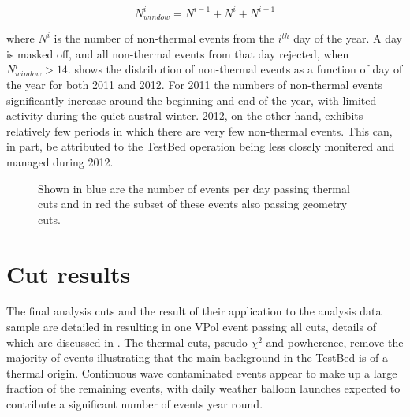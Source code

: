 \begin{equation}
  N^{i}_{window} = N^{i-1} + N^{i} + N^{i+1}
\end{equation}

\noindent where $N^{i}$ is the number of non-thermal events from the $i^{th}$ day of the year. A day is masked off, and all non-thermal events from that day rejected, when $N^{i}_{window} > 14$.  shows the distribution of non-thermal events as a function of day of the year for both 2011 and 2012. For 2011 the numbers of non-thermal events significantly increase around the beginning and end of the year, with limited activity during the quiet austral winter. 2012, on the other hand, exhibits relatively few periods in which there are very few non-thermal events. This can, in part, be attributed to the TestBed operation being less closely monitered and managed during 2012.

\begin{figure}[htpb]
\hfill
{}
\caption{Shown in blue are the number of events per day passing thermal cuts and in red the subset of these events also passing geometry cuts.}
\label{fig:Analysis:Anthroprogenic-Cuts:GoodTimes:Event-Rate}
\end{figure}

\section{Cut results}
\label{sec:Analysis:Cut-Results}

The final analysis cuts and the result of their application to the analysis data sample are detailed in  resulting in one VPol event passing all cuts, details of which are discussed in . The thermal cuts, pseudo-$\chi^{2}$ and powherence, remove the majority of events illustrating that the main background in the TestBed is of a thermal origin. Continuous wave contaminated events appear to make up a large fraction of the remaining events, with daily weather balloon launches expected to contribute a significant number of events year round. 

